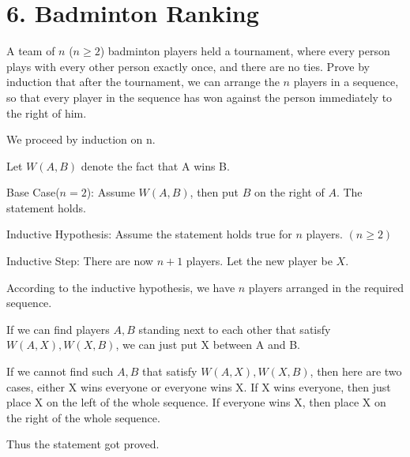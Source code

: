 \documentclass{article}\usepackage{amsmath,amssymb,amsthm,tikz,tkz-graph,color,chngpage,soul,hyperref,csquotes,graphicx,floatrow, yfonts}\newcommand*{\QEDB}{\hfill\ensuremath{\square}}\newtheorem*{prop}{Proposition}\renewcommand{\theenumi}{\alph{enumi}}\usepackage[shortlabels]{enumitem}\usepackage[nobreak=true, framemethod=tikz]{mdframed}\usetikzlibrary{matrix,calc, automata, positioning}\MakeOuterQuote{"}\usepackage[margin=1in]{geometry} \newtheorem{theorem}{Theorem}
\begin{document}
\section*{6. Badminton Ranking}
A team of $n$ ($n \geq 2$) badminton players held a tournament, where every person plays with every other person exactly once, and there are no ties. Prove by induction that after the tournament, we can arrange the $n$ players in a sequence, so that every player in the sequence has won against the person immediately to the right of him.
\begin{mdframed}
 We proceed by induction on n. \par
 Let $W(A, B)$ denote the fact that A wins B. \par
 Base Case($n = 2$): Assume $W(A, B)$, then put $B$ on the right of $A$. The statement holds. \par
 Inductive Hypothesis: Assume the statement holds true for $n$ players. $(n \geq 2)$  \par
 Inductive Step: There are now $n + 1$ players. Let the new player be $X$. \par 
 According to the inductive hypothesis, we have $n$ players arranged in the required sequence. \par 
 If we can find players $A, B$ standing next to each other that satisfy $W(A, X), W(X, B)$, we can just put X between A and B.\par
 If we cannot find such $A, B$ that satisfy $W(A, X), W(X, B)$, then here are two cases, either X wins everyone or everyone wins X. If X wins everyone, then just place X on the left of the whole sequence. If everyone wins X, then place X on the right of the whole sequence.\par
 Thus the statement got proved.
\end{mdframed}

\end{document}
